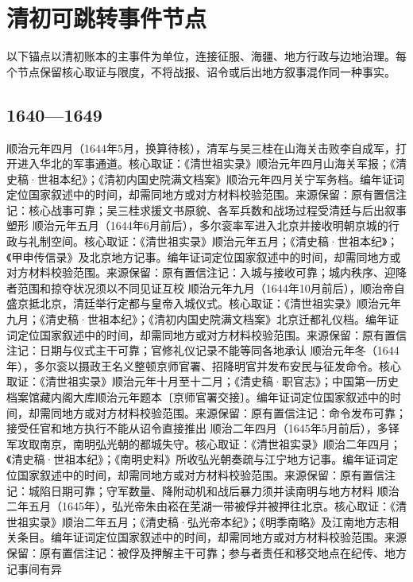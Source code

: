 \section{清初可跳转事件节点}
以下锚点以清初账本的主事件为单位，连接征服、海疆、地方行政与边地治理。每个节点保留核心取证与限度，不将战报、诏令或后出地方叙事混作同一种事实。
\subsection{1640—1649}
顺治元年四月（1644年5月，换算待核），清军与吴三桂在山海关击败李自成军，打开进入华北的军事通道。核心取证：《清世祖实录》顺治元年四月山海关军报；《清史稿·世祖本纪》；《清初内国史院满文档案》顺治元年四月关宁军务档。编年证词定位国家叙述中的时间，却需同地方或对方材料校验范围。来源保留：原有置信注记：核心战事可靠；吴三桂求援文书原貌、各军兵数和战场过程受清廷与后出叙事塑形
顺治元年五月（1644年6月前后），多尔衮率军进入北京并接收明朝京城的行政与礼制空间。核心取证：《清世祖实录》顺治元年五月；《清史稿·世祖本纪》；《甲申传信录》及北京地方记事。编年证词定位国家叙述中的时间，却需同地方或对方材料校验范围。来源保留：原有置信注记：入城与接收可靠；城内秩序、迎降者范围和掠夺状况须以不同见证互校
顺治元年九月（1644年10月前后），顺治帝自盛京抵北京，清廷举行定都与皇帝入城仪式。核心取证：《清世祖实录》顺治元年九月；《清史稿·世祖本纪》；《清初内国史院满文档案》北京迁都礼仪档。编年证词定位国家叙述中的时间，却需同地方或对方材料校验范围。来源保留：原有置信注记：日期与仪式主干可靠；官修礼仪记录不能等同各地承认
顺治元年冬（1644年），多尔衮以摄政王名义整顿京师官署、招降明官并发布安民与征发命令。核心取证：《清世祖实录》顺治元年十月至十二月；《清史稿·职官志》；中国第一历史档案馆藏内阁大库顺治元年题本〔京师官署交接〕。编年证词定位国家叙述中的时间，却需同地方或对方材料校验范围。来源保留：原有置信注记：命令发布可靠；接受任官和地方执行不能从诏令直接推出
顺治二年四月（1645年5月前后），多铎军攻取南京，南明弘光朝的都城失守。核心取证：《清世祖实录》顺治二年四月；《清史稿·世祖本纪》；《南明史料》所收弘光朝奏疏与江宁地方记事。编年证词定位国家叙述中的时间，却需同地方或对方材料校验范围。来源保留：原有置信注记：城陷日期可靠；守军数量、降附动机和战后暴力须并读南明与地方材料
顺治二年五月（1645年），弘光帝朱由崧在芜湖一带被俘并被押往北京。核心取证：《清世祖实录》顺治二年五月；《清史稿·弘光帝本纪》；《明季南略》及江南地方志相关条目。编年证词定位国家叙述中的时间，却需同地方或对方材料校验范围。来源保留：原有置信注记：被俘及押解主干可靠；参与者责任和移交地点在纪传、地方记事间有异
